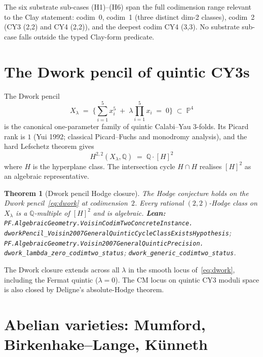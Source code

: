 \documentclass[11pt,a4paper]{article}
\theoremstyle{plain}
\newtheorem{theorem}{Theorem}[section]
\theoremstyle{definition}
\begin{document}
The six substrate sub-cases (H1)--(H6) span the full codimension
range relevant to the Clay statement: codim~0, codim~1 (three
distinct dim-2 classes), codim~2 (CY3 (2,2) and CY4 (2,2)), and
the deepest codim CY4 (3,3). No substrate sub-case falls outside
the typed Clay-form predicate.

\section{The Dwork pencil of quintic CY3s}
\label{sec:dwork}

The Dwork pencil
\begin{equation}
\label{eq:dwork}
X_{\lambda} \;=\; \Big\{\sum_{i=1}^{5} x_{i}^{5}
\;+\; \lambda \prod_{i=1}^{5} x_{i} \;=\; 0\Big\}
\;\subset\; \mathbb{P}^{4}
\end{equation}
is the canonical one-parameter family of quintic Calabi--Yau
3-folds. Its Picard rank is $1$ (Yui 1992; classical Picard--Fuchs
and monodromy analysis), and the hard Lefschetz theorem gives
\begin{equation}
\label{eq:lefschetz}
H^{2, 2}(X_{\lambda}, \mathbb{Q}) \;=\; \mathbb{Q} \cdot [H]^{2}
\end{equation}
where $H$ is the hyperplane class. The intersection cycle $H \cap
H$ realises $[H]^{2}$ as an algebraic representative.

\begin{theorem}[Dwork pencil Hodge closure]
\label{thm:dwork}
The Hodge conjecture holds on the Dwork pencil~\eqref{eq:dwork} at
codimension~$2$. Every rational $(2, 2)$-Hodge class on
$X_{\lambda}$ is a $\mathbb{Q}$-multiple of $[H]^{2}$ and is
algebraic.
\textbf{Lean:}
\texttt{PF.AlgebraicGeometry.VoisinCodimTwoConcreteInstance.\\
dworkPencil\_Voisin2007GeneralQuinticCycleClassExistsHypothesis};
\texttt{PF.AlgebraicGeometry.Voisin2007GeneralQuinticPrecision.\\
dwork\_lambda\_zero\_codimtwo\_status};
\texttt{dwork\_generic\_codimtwo\_status}.
\end{theorem}

The Dwork closure extends across all $\lambda$ in the smooth locus
of~\eqref{eq:dwork}, including the Fermat quintic ($\lambda = 0$).
The CM locus on quintic CY3 moduli space is also closed by
Deligne's absolute-Hodge theorem.

\section{Abelian varieties: Mumford, Birkenhake--Lange, K\"unneth}
\label{sec:abelian}
\end{document}
